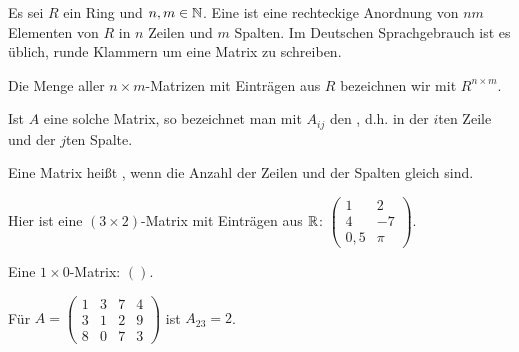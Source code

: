 \begin{definition}
    Es sei $R$ ein Ring und $n,m\in\mathbb{N}$. Eine  ist eine rechteckige Anordnung von $nm$ Elementen von $R$ in $n$ Zeilen und $m$ Spalten. Im Deutschen Sprachgebrauch ist es üblich, runde Klammern um eine Matrix zu schreiben.

    Die Menge aller $n\times m$-Matrizen mit Einträgen aus $R$ bezeichnen wir mit $R^{n\times m}$.

    Ist $A$ eine solche Matrix, so bezeichnet man mit $A_{ij}$ den , d.h. in der $i$ten Zeile und der $j$ten Spalte.

    Eine Matrix heißt , wenn die Anzahl der Zeilen und
    der Spalten gleich sind.
\end{definition}

\begin{example}
    Hier ist eine $(3\times2)$-Matrix mit Einträgen aus $\mathbb{R}$:
    $\begin{pmatrix}
         1& 2\\4& -7\\0,5& \pi
    \end{pmatrix}$.
\end{example}

\begin{example}
    Eine $1\times 0$-Matrix: $()$.
\end{example}

\begin{example}
    Für $A=\begin{pmatrix}
               1& 3& 7& 4\\3& 1& 2& 9\\8& 0& 7& 3
    \end{pmatrix}$
    ist $A_{23}=2$.
\end{example}

